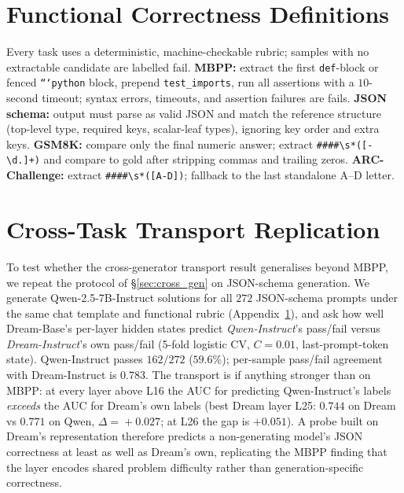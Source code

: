 \documentclass[11pt]{article}
\begin{document}
\section{Functional Correctness Definitions}
\label{sec:appendix_correctness}

Every task uses a deterministic, machine-checkable rubric; samples with no extractable candidate are labelled fail.
\textbf{MBPP:} extract the first \texttt{def}-block or fenced \texttt{```python} block, prepend \texttt{test\_imports}, run all assertions with a $10$-second timeout; syntax errors, timeouts, and assertion failures are fails.
\textbf{JSON schema:} output must parse as valid JSON and match the reference structure (top-level type, required keys, scalar-leaf types), ignoring key order and extra keys.
\textbf{GSM8K:} compare only the final numeric answer; extract \texttt{\#\#\#\#\textbackslash s*([-\textbackslash d.]+)} and compare to gold after stripping commas and trailing zeros.
\textbf{ARC-Challenge:} extract \texttt{\#\#\#\#\textbackslash s*([A-D])}; fallback to the last standalone A--D letter.

\section{Cross-Task Transport Replication}
\label{sec:appendix_transport}

To test whether the cross-generator transport result generalises beyond MBPP, we repeat the protocol of \S\ref{sec:cross_gen} on JSON-schema generation.
We generate Qwen-2.5-7B-Instruct solutions for all $272$ JSON-schema prompts under the same chat template and functional rubric (Appendix~\ref{sec:appendix_correctness}), and ask how well Dream-Base's per-layer hidden states predict \emph{Qwen-Instruct}'s pass/fail versus \emph{Dream-Instruct}'s own pass/fail (5-fold logistic CV, $C{=}0.01$, last-prompt-token state).
Qwen-Instruct passes $162/272$ ($59.6\%$); per-sample pass/fail agreement with Dream-Instruct is $0.783$.
The transport is if anything stronger than on MBPP: at every layer above L16 the AUC for predicting Qwen-Instruct's labels \emph{exceeds} the AUC for Dream's own labels (best Dream layer L25: $0.744$ on Dream vs $0.771$ on Qwen, $\Delta\!=\!+0.027$; at L26 the gap is $+0.051$).
A probe built on Dream's representation therefore predicts a non-generating model's JSON correctness at least as well as Dream's own, replicating the MBPP finding that the layer encodes shared problem difficulty rather than generation-specific correctness.
\end{document}
